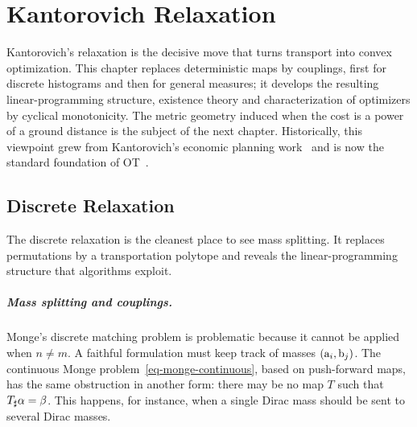 
\chapter{Kantorovich Relaxation}
\label{sec-kantorovich}

Kantorovich's relaxation is the decisive move that turns transport into convex optimization. This chapter replaces deterministic maps by couplings, first for discrete histograms and then for general measures; it develops the resulting linear-programming structure, existence theory and characterization of optimizers by cyclical monotonicity. The metric geometry induced when the cost is a power of a ground distance is the subject of the next chapter. Historically, this viewpoint grew from Kantorovich's economic planning work~\cite{Kantorovich42} and is now the standard foundation of OT~\cite{Villani03,Villani09,rachev1998mass2}.

\section{Discrete Relaxation}
\label{sec-discrete-relaxation}

The discrete relaxation is the cleanest place to see mass splitting. It replaces permutations by a transportation polytope and reveals the linear-programming structure that algorithms exploit.

\paragraph{Mass splitting and couplings.}

Monge's discrete matching problem is problematic because it cannot be applied when $n \neq m$. A faithful formulation must keep track of masses $(\mathrm{a}_i,\mathrm{b}_j)$. The continuous Monge problem~\eqref{eq-monge-continuous}, based on push-forward maps, has the same obstruction in another form: there may be no map $T$ such that $T_\sharp\alpha=\beta$. This happens, for instance, when a single Dirac mass should be sent to several Dirac masses.

